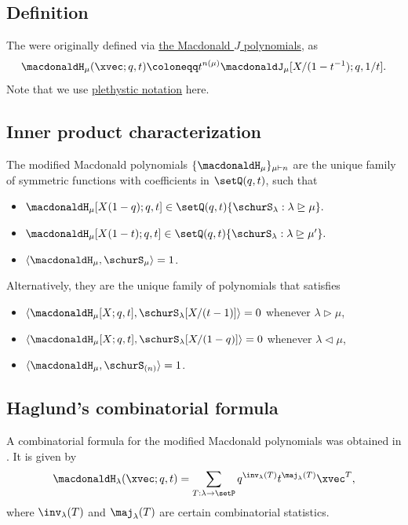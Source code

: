 \subsection[macdonaldHDefinitionViaMacdonaldJ]{Definition}

The \label{modifiedMacdonaldPolynomial}
were originally defined via \hyperref[macdonaldJ]{the Macdonald $J$
polynomials}, as
\[
\macdonaldH_{\mu}(\xvec;q,t)
\coloneqq
t^{n(\mu)} \macdonaldJ_\mu[X/(1-t^{-1});q,1/t].
\]
Note that we use \hyperref[plethysm]{plethystic notation} here.


\subsection[macdonaldHUniqueDefinition]{Inner product characterization}

The modified Macdonald polynomials $\{\macdonaldH_{\mu} \}_{\mu \vdash n}$
are the unique family of symmetric functions with coefficients in $\setQ(q,t)$,
such that
\begin{itemize}
\item
$
\macdonaldH_{\mu}[X(1-q);q,t]
\in
\setQ(q,t)\{ \schurS_\lambda : \lambda \trianglerighteq \mu \}.
$
\item
$
\macdonaldH_{\mu}[X(1-t);q,t]
\in
\setQ(q,t)\{ \schurS_\lambda : \lambda \trianglerighteq \mu' \}.
$
\item $\langle \macdonaldH_{\mu} , \schurS_\mu \rangle = 1$.
\end{itemize}

Alternatively, they are the unique family of polynomials that satisfies
\begin{itemize}
\item
$
\langle \macdonaldH_{\mu}[X;q,t], \schurS_\lambda[X/(t-1)] \rangle =0
$
whenever $\lambda \triangleright \mu$,
\item
$
\langle \macdonaldH_{\mu}[X;q,t], \schurS_\lambda[X/(1-q)] \rangle =0
$
whenever $\lambda \triangleleft \mu$,
\item $\langle \macdonaldH_{\mu} , \schurS_{(n)} \rangle = 1$.
\end{itemize}



\subsection[macdonaldHCombinatorialFormula]{Haglund's combinatorial formula}

A combinatorial formula for the modified Macdonald polynomials was obtained in
\cite{HaglundHaimanLoehr2005}.
It is given by
\[
\macdonaldH_{\lambda}(\xvec;q,t)
=
\sum_{T:\lambda \to \setP}
q^{\inv_\lambda(T)} t^{\maj_\lambda(T)} \xvec^T,
\]
where $\inv_\lambda(T)$ and $\maj_\lambda(T)$ are certain combinatorial statistics.

